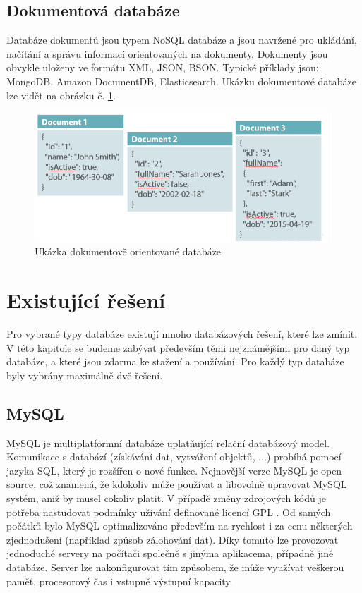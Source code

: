 \subsection{Dokumentová databáze}
Databáze dokumentů jsou typem NoSQL databáze a  jsou navržené pro ukládání, načítání a správu informací orientovaných na dokumenty. Dokumenty jsou obvykle uloženy ve formátu \gls{XML}, \gls{JSON}, \gls{BSON}. 
Typické příklady jsou: MongoDB, Amazon DocumentDB, Elasticsearch. Ukázku dokumentové databáze lze vidět na obrázku č. \ref{fig:db_img_document}.
	\begin{figure}[H]
	\centering
	\includegraphics[width=11cm]{img/databaze/document_db}
	\caption{Ukázka dokumentově orientované databáze}
	\label{fig:db_img_document}
	\end{figure}

\section{Existující řešení}
Pro vybrané typy databáze existují mnoho databázových řešení, které lze zmínit. V této kapitole se budeme zabývat především těmi nejznámějšími pro daný typ databáze, a které jsou zdarma ke stažení a používání. Pro každý typ databáze byly vybrány maximálně dvě řešení.
\subsection{MySQL}
MySQL je multiplatformní databáze uplatňující relační databázový model. Komunikace s databází (získávání dat, vytváření objektů, ...) probíhá pomocí jazyka \gls{SQL}, který je rozšířen o nové funkce. Nejnovější verze MySQL je open-source, což znamená, že kdokoliv může používat a libovolně upravovat MySQL systém, aniž by musel cokoliv platit. V případě změny zdrojových kódů je potřeba nastudovat podmínky užívání definované licencí \gls{GPL} \cite{mysql}.
\newline
\indent Od samých počátků bylo MySQL optimalizováno především na rychlost i za cenu některých zjednodušení (například způsob zálohování dat). Díky tomuto lze provozovat jednoduché servery na počítači společně s jinýma aplikacema, případně jiné databáze. Server lze nakonfigurovat tím způsobem, že může využívat veškerou paměť, procesorový čas i vstupně výstupní kapacity.
\newline

